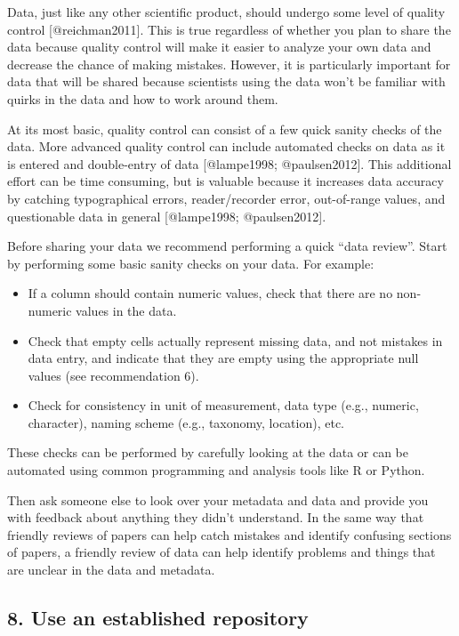 Data, just like any other scientific product, should undergo some level
of quality control {[}@reichman2011{]}. This is true regardless of
whether you plan to share the data because quality control will make it
easier to analyze your own data and decrease the chance of making
mistakes. However, it is particularly important for data that will be
shared because scientists using the data won't be familiar with quirks
in the data and how to work around them.

At its most basic, quality control can consist of a few quick sanity
checks of the data. More advanced quality control can include automated
checks on data as it is entered and double-entry of data {[}@lampe1998;
@paulsen2012{]}. This additional effort can be time consuming, but is
valuable because it increases data accuracy by catching typographical
errors, reader/recorder error, out-of-range values, and questionable
data in general {[}@lampe1998; @paulsen2012{]}.

Before sharing your data we recommend performing a quick ``data
review''. Start by performing some basic sanity checks on your data. For
example:

\begin{itemize}
\itemsep1pt\parskip0pt
\item
  If a column should contain numeric values, check that there are no
  non-numeric values in the data.
\item
  Check that empty cells actually represent missing data, and not
  mistakes in data entry, and indicate that they are empty using the
  appropriate null values (see recommendation 6).
\item
  Check for consistency in unit of measurement, data type (e.g.,
  numeric, character), naming scheme (e.g., taxonomy, location), etc.
\end{itemize}

These checks can be performed by carefully looking at the data or can be
automated using common programming and analysis tools like R or Python.

Then ask someone else to look over your metadata and data and provide
you with feedback about anything they didn't understand. In the same way
that friendly reviews of papers can help catch mistakes and identify
confusing sections of papers, a friendly review of data can help
identify problems and things that are unclear in the data and metadata.

\subsection{8. Use an established
repository}\label{use-an-established-repository}

